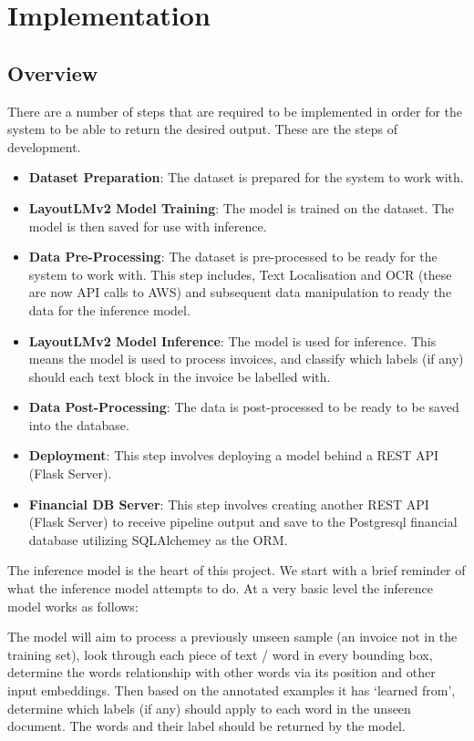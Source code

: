 \chapter{Implementation}
\label{chap3}
\label{sec:pipeline}
\section{Overview}
There are a number of steps that are required to be implemented in order for the system to be able to return the desired output.
These are the steps of development.
\begin{itemize}
	\item \textbf{Dataset Preparation}: The dataset is prepared for the system to work with.
	\item \textbf{LayoutLMv2 Model Training}: The model is trained on the dataset. The model is then saved for use with inference.
	\item \textbf{Data Pre-Processing}: The dataset is pre-processed to be ready for the system to work with. This step includes,
	      Text Localisation and OCR (these are now API calls to AWS) and subsequent data manipulation to ready the data for the inference model.
	\item \textbf{LayoutLMv2 Model Inference}: The model is used for inference. This means the model is used to process invoices,
	      and classify which labels (if any) should each text block in the invoice be labelled with.
	\item \textbf{Data Post-Processing}: The data is post-processed to be ready to be saved into the database.
	\item \textbf{Deployment}: This step involves deploying a model behind a REST API (Flask Server).
	\item \textbf{Financial DB Server}: This step involves creating another REST API (Flask Server) to receive pipeline output and
	      save to the Postgresql financial database utilizing SQLAlchemey as the ORM.
\end{itemize}
The inference model is the heart of this project. We start with a brief reminder of what the inference model attempts to do.
At a very basic level the inference model works as follows: \\
\begin{quoting}
	The model will aim to process a previously unseen sample (an invoice not in the training set), look through each piece of
	text / word in every bounding box, determine the words relationship with other words via its position and other input embeddings.
	Then based on the annotated examples it has `learned from', determine which labels (if any) should apply to each word in the unseen
	document. The words and their label should be returned by the model.
\end{quoting}
